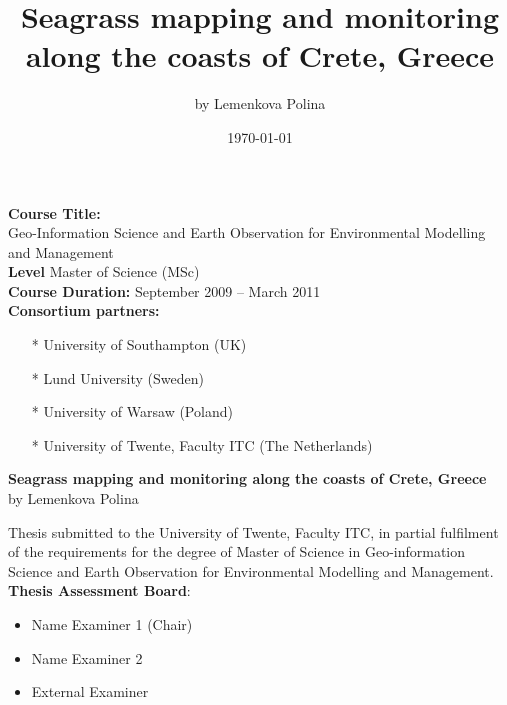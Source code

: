 \documentclass[10pt, a4paper]{article}
\begin{document}

\title{Seagrass mapping and monitoring along the coasts of Crete, Greece}
\author{by Lemenkova Polina}
\date{\today}
\maketitle
\pagebreak

\textbf{Course Title:} \\
{Geo-Information Science and Earth Observation for Environmental Modelling and Management}\\


\textbf{Level} \hfill{Master of Science (MSc)}\\
\textbf{Course Duration:} \hfill{September 2009 – March 2011}\\
\textbf{Consortium partners:} \\

\begin{itemize}
	\item[*] University of Southampton (UK)\\
	\item[*] Lund University (Sweden)\\
	\item[*] University of Warsaw (Poland)\\
	\item[*] University of Twente, Faculty ITC (The Netherlands)
\end{itemize}
\pagebreak

\begin{center}
\textbf{Seagrass mapping and monitoring along the coasts of Crete, Greece}\\
 {by Lemenkova Polina}
\end{center}

Thesis submitted to the University of Twente, Faculty ITC, in partial fulfilment of the requirements
for the degree of Master of Science in Geo-information Science and Earth Observation for
Environmental Modelling and Management.\\

\textbf{Thesis Assessment Board}:
\begin{itemize}
	\item Name Examiner 1 (Chair)
	\item Name Examiner 2
	\item External Examiner
\end{itemize}

\vspace{2em}
\end{document}
